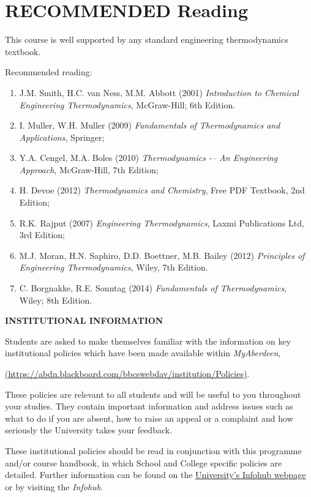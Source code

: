 \documentclass[12pts,a4paper,amsmath,amssymb,floatfix]{article}%
\begin{document}
\section{RECOMMENDED Reading}
This course is well supported by any standard engineering thermodynamics textbook.

Recommended reading:
\begin{enumerate}[1.]
   \item J.M. Smith, H.C. van Ness, M.M. Abbott (2001) {\it Introduction to Chemical Engineering Thermodynamics}, McGraw-Hill; 6th Edition.
   \item I. Muller, W.H. Muller (2009) {\it Fundamentals of Thermodynamics and Applications}, Springer;
   \item Y.A. Cengel, M.A. Boles (2010) {\it Thermodynamics -– An Engineering Approach}, McGraw-Hill, 7th Edition;
   \item H. Devoe (2012) {\it Thermodynamics and Chemistry}, Free PDF Textbook, 2nd Edition;
   \item R.K. Rajput (2007) {\it Engineering Thermodynamics}, Laxmi Publications Ltd, 3rd Edition;
   \item M.J. Moran, H.N. Saphiro, D.D. Boettner, M.B. Bailey (2012) {\it Principles of Engineering Thermodynamics}, Wiley, 7th Edition.
   \item C. Borgnakke, R.E. Sonntag (2014) {\it Fundamentals of Thermodynamics}, Wiley; 8th Edition.
\end{enumerate}


\bigskip

{\large {\bf INSTITUTIONAL INFORMATION}}

Students are asked to make themselves familiar with the information on key institutional policies which have been made available within {\it MyAberdeen},
\begin{center}
\href{https://abdn.blackboard.com/bbcswebdav/institution/Policies}{(https://abdn.blackboard.com/bbcswebdav/institution/Policies)}.
\end{center}
These policies are relevant to all students and will be useful to you throughout your studies. They contain important information and address issues such as what to do if you are absent, how to raise an appeal or a complaint and how seriously the University takes your feedback. 
\medskip

These institutional policies should be read in conjunction with this programme and/or course handbook, in which School and College specific policies are detailed. Further information can be found on the \href{http:www.abdn.ac.uk/infohub/}{University's Infohub webpage} or by visiting the {\it Infohub}.
\end{document}
